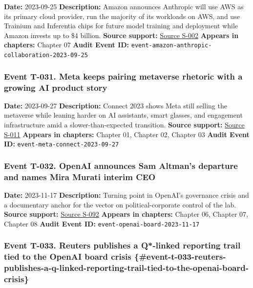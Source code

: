 \documentclass[
  american,
  11pt,
  letterpaper,
]{article}
\begin{document}
\textbf{Date:} 2023-09-25 \textbf{Description:} Amazon announces
Anthropic will use AWS as its primary cloud provider, run the majority
of its workloads on AWS, and use Trainium and Inferentia chips for
future model training and deployment while Amazon invests up to \$4
billion. \textbf{Source support:}
\hyperref[source-s-002-amazon-and-anthropic-announce-strategic-collaboration-to-advance-generative-ai]{Source
S-002} \textbf{Appears in chapters:} Chapter 07 \textbf{Audit Event ID:}
\texttt{event-amazon-anthropic-collaboration-2023-09-25}

\subsubsection{Event T-031. Meta keeps pairing metaverse rhetoric with a
growing AI product
story}\label{event-t-031-meta-keeps-pairing-metaverse-rhetoric-with-a-growing-ai-product-story}

\textbf{Date:} 2023-09-27 \textbf{Description:} Connect 2023 shows Meta
still selling the metaverse while leaning harder on AI assistants, smart
glasses, and engagement infrastructure amid a slower-than-expected
transition. \textbf{Source support:}
\hyperref[source-s-011-meta-ceo-mark-zuckerberg-kicks-off-developer-conference-with-focus-on-ai-virtual-reality]{Source
S-011} \textbf{Appears in chapters:} Chapter 01, Chapter 02, Chapter 03
\textbf{Audit Event ID:} \texttt{event-meta-connect-2023-09-27}

\subsubsection{Event T-032. OpenAI announces Sam Altman's departure and
names Mira Murati interim
CEO}\label{event-t-032-openai-announces-sam-altmans-departure-and-names-mira-murati-interim-ceo}

\textbf{Date:} 2023-11-17 \textbf{Description:} Turning point in
OpenAI's governance crisis and a documentary anchor for the vector on
political-corporate control of the lab. \textbf{Source support:}
\hyperref[source-s-092-openai-announces-leadership-transition]{Source
S-092} \textbf{Appears in chapters:} Chapter 06, Chapter 07, Chapter 08
\textbf{Audit Event ID:} \texttt{event-openai-board-2023-11-17}

\subsubsection{Event T-033. Reuters publishes a Q*-linked reporting
trail tied to the OpenAI board crisis
\{\#event-t-033-reuters-publishes-a-q-linked-reporting-trail-tied-to-the-openai-board-crisis\}}\label{event-t-033.-reuters-publishes-a-q-linked-reporting-trail-tied-to-the-openai-board-crisis-event-t-033-reuters-publishes-a-q-linked-reporting-trail-tied-to-the-openai-board-crisis}
\end{document}
